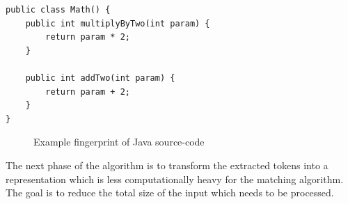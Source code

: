 \newsavebox{\firstlisting}
\begin{lrbox}{\firstlisting}
\begin{lstlisting}
public class Math() {
    public int multiplyByTwo(int param) {
        return param * 2;
    }

    public int addTwo(int param) {
        return param + 2;
    }
}
\end{lstlisting}
\end{lrbox}
\begin{figure}[htp]
	\begin{center}
        \hspace{1cm}

        \vspace{0.5cm}
	\end{center}
	\caption{Example fingerprint of Java source-code}
	\label{fig:fingerprint}
\end{figure}

The next phase of the algorithm is to transform the extracted tokens into a
representation which is less computationally heavy for the matching algorithm. The goal is
to reduce the total size of the input which needs to be processed.


